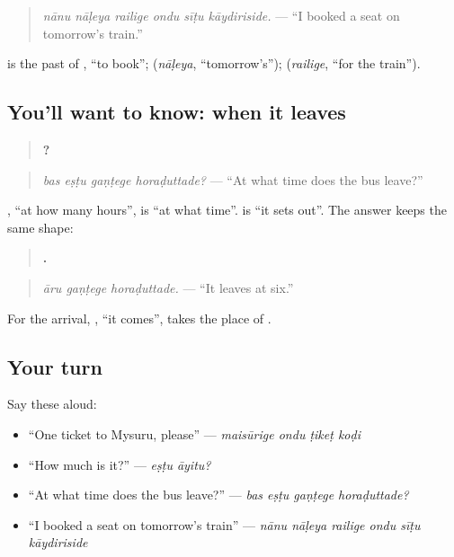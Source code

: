\begin{quote}
\emph{nānu nāḷeya railige ondu sīṭu kāydiriside.} — \textquotedblleft{}I booked a seat on tomorrow's train.\textquotedblright{}
\end{quote}

\textbf{} is the past of \textbf{}, \textquotedblleft{}to book\textquotedblright{}; \textbf{} (\emph{nāḷeya}, \textquotedblleft{}tomorrow's\textquotedblright{}); \textbf{} (\emph{railige}, \textquotedblleft{}for the train\textquotedblright{}).

\subsection*{You'll want to know: when it leaves}
\begin{quote}
\textbf{   ?}
\end{quote}

\begin{quote}
\emph{bas eṣṭu gaṇṭege horaḍuttade?} — \textquotedblleft{}At what time does the bus leave?\textquotedblright{}
\end{quote}

\textbf{ }, \textquotedblleft{}at how many hours\textquotedblright{}, is \textquotedblleft{}at what time\textquotedblright{}. \textbf{} is \textquotedblleft{}it sets out\textquotedblright{}. The answer keeps the same shape:

\begin{quote}
\textbf{  .}
\end{quote}

\begin{quote}
\emph{āru gaṇṭege horaḍuttade.} — \textquotedblleft{}It leaves at six.\textquotedblright{}
\end{quote}

For the arrival, \textbf{}, \textquotedblleft{}it comes\textquotedblright{}, takes the place of \textbf{}.

\subsection*{Your turn}
Say these aloud:

\begin{itemize}
\raggedright
  \item \textquotedblleft{}One ticket to Mysuru, please\textquotedblright{} — \emph{maisūrige ondu ṭikeṭ koḍi}
  \item \textquotedblleft{}How much is it?\textquotedblright{} — \emph{eṣṭu āyitu?}
  \item \textquotedblleft{}At what time does the bus leave?\textquotedblright{} — \emph{bas eṣṭu gaṇṭege horaḍuttade?}
  \item \textquotedblleft{}I booked a seat on tomorrow's train\textquotedblright{} — \emph{nānu nāḷeya railige ondu sīṭu kāydiriside}
\end{itemize}

